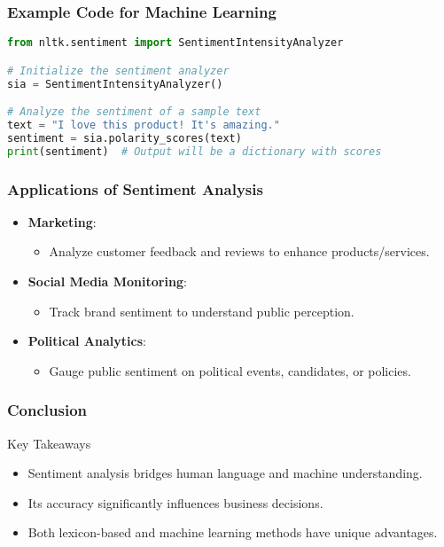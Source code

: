 \documentclass[aspectratio=169]{beamer}
\begin{document}
\begin{frame}[fragile]
    \frametitle{Example Code for Machine Learning}
    \begin{lstlisting}[language=Python]
from nltk.sentiment import SentimentIntensityAnalyzer

# Initialize the sentiment analyzer
sia = SentimentIntensityAnalyzer()

# Analyze the sentiment of a sample text
text = "I love this product! It's amazing."
sentiment = sia.polarity_scores(text)
print(sentiment)  # Output will be a dictionary with scores
    \end{lstlisting}
\end{frame}

\begin{frame}
    \frametitle{Applications of Sentiment Analysis}
    \begin{itemize}
        \item \textbf{Marketing}:
        \begin{itemize}
            \item Analyze customer feedback and reviews to enhance products/services.
        \end{itemize}
        \item \textbf{Social Media Monitoring}:
        \begin{itemize}
            \item Track brand sentiment to understand public perception.
        \end{itemize}
        \item \textbf{Political Analytics}:
        \begin{itemize}
            \item Gauge public sentiment on political events, candidates, or policies.
        \end{itemize}
    \end{itemize}
\end{frame}

\begin{frame}
    \frametitle{Conclusion}
    \begin{block}{Key Takeaways}
        \begin{itemize}
            \item Sentiment analysis bridges human language and machine understanding.
            \item Its accuracy significantly influences business decisions.
            \item Both lexicon-based and machine learning methods have unique advantages.
        \end{itemize}
    \end{block}
\end{frame}
\end{document}
